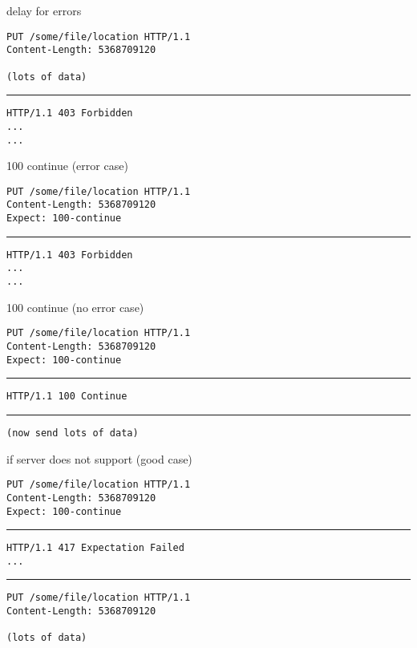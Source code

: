 \begin{frame}[fragile]{delay for errors}
\begin{Verbatim}
PUT /some/file/location HTTP/1.1
Content-Length: 5368709120

(lots of data)
\end{Verbatim}
\rule{0.9\textwidth}{1mm}
\begin{Verbatim}
HTTP/1.1 403 Forbidden
...
...
\end{Verbatim}
\end{frame}


\begin{frame}[fragile]{100 continue (error case)}
\begin{Verbatim}[fontsize=\small]
PUT /some/file/location HTTP/1.1
Content-Length: 5368709120
Expect: 100-continue

\end{Verbatim}
\rule{0.9\textwidth}{1mm}
\begin{Verbatim}
HTTP/1.1 403 Forbidden
...
...
\end{Verbatim}
\end{frame}

\begin{frame}[fragile]{100 continue (no error case)}
\begin{Verbatim}[fontsize=\small]
PUT /some/file/location HTTP/1.1
Content-Length: 5368709120
Expect: 100-continue

\end{Verbatim}
\rule{0.9\textwidth}{1mm}
\begin{Verbatim}
HTTP/1.1 100 Continue

\end{Verbatim}
\rule{0.9\textwidth}{1mm}
\begin{Verbatim}[fontsize=\small]
(now send lots of data)
\end{Verbatim}
\end{frame}

\begin{frame}[fragile]{if server does not support (good case)}
\begin{Verbatim}[fontsize=\small]
PUT /some/file/location HTTP/1.1
Content-Length: 5368709120
Expect: 100-continue

\end{Verbatim}
\rule{0.9\textwidth}{1mm}
\begin{Verbatim}
HTTP/1.1 417 Expectation Failed
...
\end{Verbatim}
\rule{0.9\textwidth}{1mm}
\begin{Verbatim}[fontsize=\small]
PUT /some/file/location HTTP/1.1
Content-Length: 5368709120

(lots of data)
\end{Verbatim}
\end{frame}

